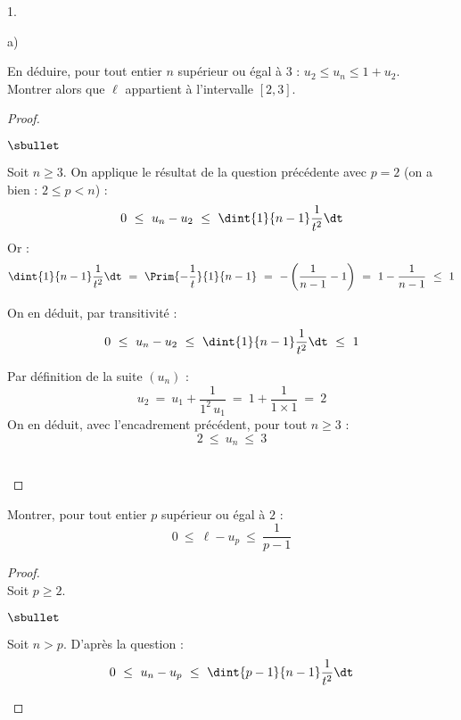 \documentclass[11pt]{article}%
\begin{document}
\begin{noliste}{1.}
\begin{noliste}{a)}
  \item En déduire, pour tout entier $n$ supérieur ou égal à $3$ :
    $u_2 \leq u_n \leq 1 + u_2$.\\
    Montrer alors que $\ell$ appartient à l'intervalle $[2,3]$.
    \begin{proof}~
      \begin{noliste}{$\sbullet$}
      \item Soit $n \geq 3$. On applique le résultat de la question
        précédente avec $p=2$ (on a bien : $2 \leq p < n$) :
        \[
          0 \ \leq \ u_n - u_2 \ \leq \ \dint{1}{n-1} \dfrac{1}{t^2}
          \dt
        \]
        Or :
        \[
          \dint{1}{n-1} \dfrac{1}{t^2} \dt \ = \
          \Prim{-\dfrac{1}{t}}{1}{n-1} \ = \ -\left(\dfrac{1}{n-1} -
            1\right) \ = \ 1 - \dfrac{1}{n-1} \ \leq \ 1
        \]
        
      \item On en déduit, par transitivité :
        \[
          0 \ \leq \ u_n - u_2 \ \leq \ \dint{1}{n-1} \dfrac{1}{t^2}
          \dt \ \leq \ 1
        \]
        
      \item Par définition de la suite $(u_n)$ :
        \[
          u_2 \ = \ u_1 + \dfrac{1}{1^2 \, u_1} \ = \ 1 + \dfrac{1}{1
            \times 1} \ = \ 2
        \]
        On en déduit, avec l'encadrement précédent, pour tout $n \geq
        3$ :
        \[
          2 \ \leq \ u_n \ \leq \ 3
        \]
        ~\\[-1.4cm]
      \end{noliste}
    \end{proof}


    \newpage
    
    
  \item Montrer, pour tout entier $p$ supérieur ou égal à $2$ :
    \[
      0 \ \leq \ \ell - u_p \ \leq \ \dfrac{1}{p-1}
    \]
    \begin{proof}~\\
      Soit $p \geq 2$.
      \begin{noliste}{$\sbullet$}
      \item Soit $n >p$. D'après la question  :
        \[
          0 \ \leq \ u_n - u_p \ \leq \ \dint{p-1}{n-1} \dfrac{1}{t^2} \dt
        \]
        

\end{noliste}
\end{proof}
\end{noliste}
\end{noliste}
\end{document}
